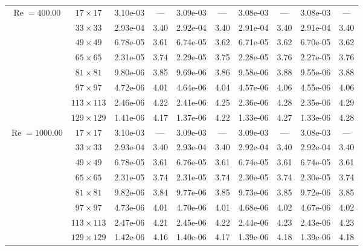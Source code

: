 \documentclass[preprint, 12pt]{elsarticle}
\begin{document}
{\begin{center}
\begin{table}[H]
{\begin{tabular*}{\textwidth}{@{\extracolsep\fill}cccccccccc@{}}
    \hline
    \multirow{7}{*}{$\operatorname{Re}=400.00$} & $17\times 17$ & 3.10e-03 & --- & 3.09e-03 & --- & 3.08e-03 & --- & 3.08e-03 & --- \\
    & $33\times 33$ & 2.93e-04 & 3.40 & 2.92e-04 & 3.40 & 2.91e-04 & 3.40 & 2.91e-04 & 3.40 \\
    & $49\times 49$ & 6.78e-05 & 3.61 & 6.74e-05 & 3.62 & 6.71e-05 & 3.62 & 6.70e-05 & 3.62 \\
    \multirow{3}{*}{$\operatorname{Wi}=10$} & $65\times 65$ & 2.31e-05 & 3.74 & 2.29e-05 & 3.75 & 2.28e-05 & 3.76 & 2.27e-05 & 3.76 \\
    & $81\times 81$ & 9.80e-06 & 3.85 & 9.69e-06 & 3.86 & 9.58e-06 & 3.88 & 9.55e-06 & 3.88 \\
    & $97\times 97$ & 4.72e-06 & 4.01 & 4.64e-06 & 4.04 & 4.57e-06 & 4.06 & 4.55e-06 & 4.06 \\
    & $113\times 113$ & 2.46e-06 & 4.22 & 2.41e-06 & 4.25 & 2.36e-06 & 4.28 & 2.35e-06 & 4.29 \\
    & $129\times 129$ & 1.41e-06 & 4.17 & 1.37e-06 & 4.22 & 1.33e-06 & 4.27 & 1.33e-06 & 4.28 \\
    \hline
    \multirow{7}{*}{$\operatorname{Re}=1000.00$} & $17\times 17$ & 3.10e-03 & --- & 3.09e-03 & --- & 3.09e-03 & --- & 3.08e-03 & --- \\
    & $33\times 33$ & 2.93e-04 & 3.40 & 2.93e-04 & 3.40 & 2.92e-04 & 3.40 & 2.92e-04 & 3.40 \\
    & $49\times 49$ & 6.78e-05 & 3.61 & 6.76e-05 & 3.61 & 6.74e-05 & 3.61 & 6.74e-05 & 3.61 \\
    \multirow{3}{*}{$\operatorname{Wi}=10$} & $65\times 65$ & 2.31e-05 & 3.74 & 2.31e-05 & 3.74 & 2.30e-05 & 3.74 & 2.30e-05 & 3.74 \\
    & $81\times 81$ & 9.82e-06 & 3.84 & 9.77e-06 & 3.85 & 9.73e-06 & 3.85 & 9.72e-06 & 3.85 \\
    & $97\times 97$ & 4.73e-06 & 4.01 & 4.70e-06 & 4.01 & 4.68e-06 & 4.02 & 4.67e-06 & 4.02 \\
    & $113\times 113$ & 2.47e-06 & 4.21 & 2.45e-06 & 4.22 & 2.44e-06 & 4.23 & 2.43e-06 & 4.23 \\
    & $129\times 129$ & 1.42e-06 & 4.16 & 1.40e-06 & 4.17 & 1.39e-06 & 4.18 & 1.39e-06 & 4.18 \\
    \hline
    \end{tabular*}
}
\end{table}
\end{center}

}
\end{document}

